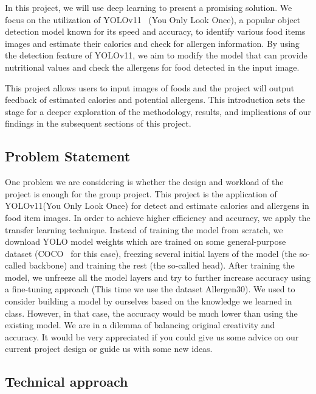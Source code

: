 \documentclass[10pt,twocolumn,letterpaper]{article}
\begin{document}
In this project, we will use deep learning to present a promising solution.
We focus on the utilization of YOLOv11~\cite{redmon2016lookonceunifiedrealtime} (You Only Look Once), a popular object detection model known for its speed and accuracy, to identify various food items images and estimate their calorics and check for allergen information.
By using the detection feature of YOLOv11, we aim to modify the model that can provide nutritional values and check the allergens for food detected in the input image.

This project allows users to input images of foods and the project will output feedback of estimated calories and potential allergens.
This introduction sets the stage for a deeper exploration of the methodology, results, and implications of our findings in the subsequent sections of this project.

\subsection{Problem Statement}

One problem we are considering is whether the design and workload of the project is enough for the group project. This project is the application of YOLOv11(You Only Look Once) for detect and estimate calories and allergens in food item images. In order to achieve higher efficiency and accuracy, we apply the transfer learning technique. Instead of training the model from scratch, we download YOLO model weights which are trained on some general-purpose dataset (COCO~\cite{lin2015microsoftcococommonobjects} for this case), freezing several initial layers of the model (the so-called backbone) and training the rest (the so-called head). After training the model, we unfreeze all the model layers and try to further increase accuracy using a fine-tuning approach (This time we use the dataset Allergen30). We used to consider building a model by ourselves based on the knowledge we learned in class. However, in that case, the accuracy would be much lower than using the existing model. We are in a dilemma of balancing original creativity and accuracy. It would be very appreciated if you could give us some advice on our current project design or guide us with some new ideas. 

\subsection{Technical approach}
\end{document}
